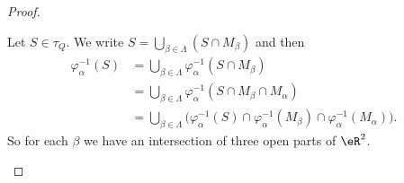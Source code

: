 \begin{proof}
\begin{subproof}
		Let \( S\in\tau_Q\). We write \( S=\bigcup_{\beta\in \Lambda}(S\cap M_{\beta})\) and then
		\begin{subequations}
			\begin{align}
				\varphi_{\alpha}^{-1}(S) & =\bigcup_{\beta\in \Lambda}\varphi_{\alpha}^{-1}(S\cap M_{\beta})                                                                         \\
				                         & =\bigcup_{\beta\in \Lambda}\varphi_{\alpha}^{-1}(S\cap M_{\beta}\cap M_{\alpha})                                                          \\
				                         & =\bigcup_{\beta\in \Lambda}\Big( \varphi_{\alpha}^{-1}(S)\cap\varphi_{\alpha}^{-1}(M_{\beta})\cap\varphi_{\alpha}^{-1}(M_{\alpha}) \Big).
			\end{align}
		\end{subequations}
		So for each \( \beta\) we have an intersection of three open parts of \( \eR^2\).
	\end{subproof}


\end{proof}
